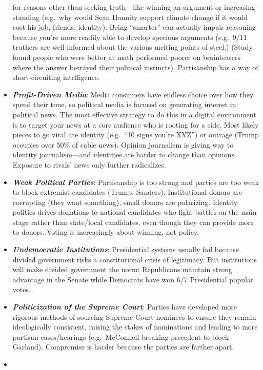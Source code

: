 \documentclass[
]{article}
\begin{document}
\begin{itemize}
  for reasons other than seeking truth---like winning an argument or
  increasing standing (e.g.~why would Sean Hannity support climate
  change if it would cost his job, friends, identity). Being ``smarter''
  can actually impair reasoning because you're more readily able to
  develop specious arguments (e.g.~9/11 truthers are well-informed about
  the various melting points of steel.) (Study found people who were
  better at math performed poorer on brainteasers where the answer
  betrayed their political instincts). Partisanship has a way of
  short-circuiting intelligence.
\item
  \textbf{\emph{Profit-Driven Media}}: Media consumers have endless
  choice over how they spend their time, so political media is focused
  on generating interest in political news. The most effective strategy
  to do this in a digital environment is to target your news at a core
  audience who is rooting for a side. Most likely pieces to go viral are
  identity (e.g.~``10 signs you're XYZ'') or outrage (Trump occupies
  over 50\% of cable news). Opinion journalism is giving way to identity
  journalism---and identities are harder to change than opinions.
  Exposure to rivals' news only further radicalizes.
\item
  \textbf{\emph{Weak Political Parties}}: Partisanship is too strong and
  parties are too weak to block extremist candidates (Trump, Sanders).
  Institutional donors are corrupting (they want something), small
  donors are polarizing. Identity politics drives donations to national
  candidates who fight battles on the main stage rather than state/local
  candidates, even though they can provide more to donors. Voting is
  increasingly about winning, not policy.
\item
  \textbf{\emph{Undemocratic Institutions}}: Presidential systems
  usually fail because divided government risks a constitutional crisis
  of legitimacy. But institutions will make divided government the norm:
  Republicans maintain strong advantage in the Senate while Democrats
  have won 6/7 Presidential popular votes.
\item
  \textbf{\emph{Politicization of the Supreme Court}}: Parties have
  developed more rigorous methods of sourcing Supreme Court nominees to
  ensure they remain ideologically consistent, raising the stakes of
  nominations and leading to more partisan cases/hearings
  (e.g.~McConnell breaking precedent to block Garland). Compromise is
  harder because the parties are farther apart.
\item

\end{itemize}
\end{document}
